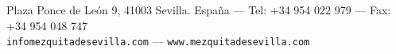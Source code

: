 \documentclass[12pt]{article}
\newenvironment{parrafo}{\begin{trivlist}\item []}{\end{trivlist}}
\begin{document}
 \scriptsize
 \begin{parrafo}
   \begin{center}
     Plaza Ponce de León 9, 41003 Sevilla. España --- 
     Tel: +34 954 022 979 --- Fax: +34 954 048 747\\
     \texttt{info{\@}mezquitadesevilla.com} ---
     \texttt{www.mezquitadesevilla.com}
   \end{center}
 \end{parrafo}

\end{document}
